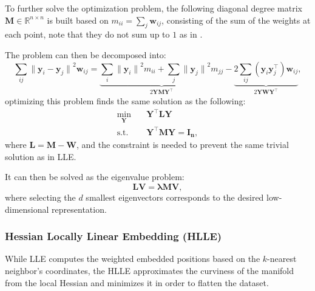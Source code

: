             To further solve the optimization problem, the following diagonal degree matrix $\boldsymbol{M}\in\mathbb{R}^{n\times n}$ is built based on $m_{ii}=\sum_j \boldsymbol{w}_{ij}$, consisting of the sum of the weights at each point, note that they do not sum up to $1$ as in .
            
            The problem can then be decomposed into:
            \begin{equation}
                \sum_{ij} {\| \boldsymbol{y}_i - \boldsymbol{y}_j \|}^2 \boldsymbol{w}_{ij} =
                    \underbrace{
                        \sum_{i} {\| \boldsymbol{y}_i\|}^2 m_{ii} +
                        \sum_{j} {\| \boldsymbol{y}_j \|}^2 m_{jj}
                    }_{2\boldsymbol{YMY^\top}} -
                    \underbrace{
                        2\sum_{ij} (\boldsymbol{y}_i \boldsymbol{y}_j^\top ) \boldsymbol{w}_{ij}
                    }_{2\boldsymbol{YWY^\top}},
            \end{equation}
            optimizing this problem finds the same solution as the following:
            \begin{align}
                \min_{\boldsymbol{Y}} \quad & \boldsymbol{Y^\top LY} \\
                \textrm{s.t.} \quad 
                    & \boldsymbol{Y^\top MY} = \boldsymbol{I_n},
            \end{align}
            where $\boldsymbol{L} = \boldsymbol{M} - \boldsymbol{W}$, and the constraint is needed to prevent the same trivial solution as in \ac{LLE}.
            
            It can then be solved as the eigenvalue problem:
            \begin{equation}
                \boldsymbol{LV} = \boldsymbol{\lambda MV},
            \end{equation}
            where selecting the $d$ smallest eigenvectors corresponds to the desired low-dimensional representation.

        \subsubsection{Hessian Locally Linear Embedding (HLLE)}
            While \ac{LLE} computes the weighted embedded positions based on the $k$-nearest neighbor's coordinates, the \ac{HLLE} \cite{hlle} approximates the curviness of the manifold from the local Hessian and minimizes it in order to flatten the dataset.

